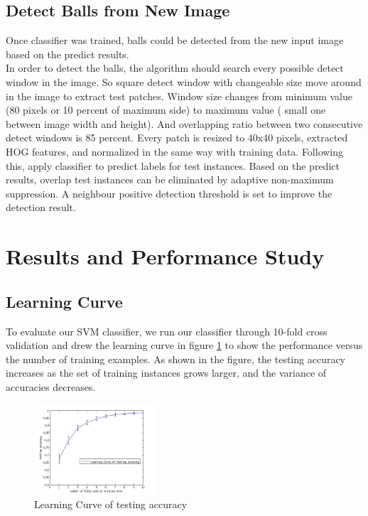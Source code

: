 \documentclass{article}
\begin{document}
\subsection{Detect Balls from New Image}
Once classifier was trained, balls could be detected from the new input image based on the predict results. \\
In order to detect the balls, the algorithm should search every possible detect window in the image. So square detect window with changeable size move around in the image to extract test patches. Window size changes from minimum value (80 pixels or 10 percent of maximum side) to maximum value ( small one between image width and height). And overlapping ratio between two consecutive detect windows is 85 percent.  Every patch is resized to 40x40 pixels, extracted HOG features, and normalized in the same way with training data. Following this, apply classifier to predict labels for test instances. Based on the predict results, overlap test instances can be eliminated by adaptive non-maximum suppression. A neighbour positive detection threshold is set to improve the detection result. 

\section{Results and Performance Study}
\subsection{Learning Curve}
To evaluate our SVM classifier, we run our classifier through 10-fold cross validation and drew the learning curve in figure \ref{fig:learning curve} to show the performance versus the number of training examples. As shown in the figure, the testing accuracy increases as the set of training instances grows larger, and the variance of accuracies decreases. 
\begin{figure}[htb]
\centering
\includegraphics[width = 0.4\textwidth]{learningcurve.jpg}
\caption{Learning Curve of testing accuracy}
\label{fig:learning curve}
\end{figure}
\end{document}
